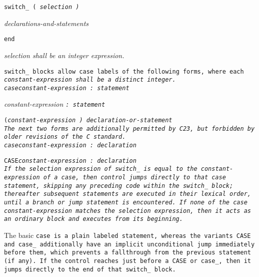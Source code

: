 \def\Subsubsection#1{\subsubsection{#1}}


\tt{switch_ (} \it{selection} \tt{)}

\s\s\s\s\it{declarations-and-statements}\opt

\tt{end}


\it{selection} shall be an integer expression.


\tt{switch_} blocks allow case labels of the following forms,
where each \it{constant-expression} shall be a distinct integer.\\

 \tt{case}\s\s\s\s\it{constant-expression} \tt{:} \it{statement}

\s\s\s\s\it{constant-expression} \tt{:} \it{statement}

\s\tt{(}\s\it{constant-expression} \tt{)}
\it{declaration-or-statement}\opt\\

The next two forms are additionally permitted by C23,
but forbidden by older revisions of the C standard.\\

\tt{case}\s\s\s\s\it{constant-expression} \tt{:} \it{declaration}

\tt{CASE}\s\s\s\s\it{constant-expression} \tt{:} \it{declaration}\\

If the \it{selection} expression of \tt{switch_}
is equal to the \it{constant-expression} of a case,
then control jumps directly to that case statement,
skipping any preceding code within the \tt{switch_} block;
thereafter subsequent statements are executed in their lexical order,
until a branch or jump statement is encountered.
If none of the case \it{constant-expression} matches the \it{selection}
expression, then it acts as an ordinary block and executes from its beginning.

The basic \tt{case} is a plain labeled statement,
whereas the variants \tt{CASE} and \tt{case_} additionally
have an implicit unconditional jump immediately before them,
which prevents a fallthrough from the previous statement (if any).
If the control reaches just before a \tt{CASE} or \tt{case_},
then it jumps directly to the end of that \tt{switch_} block.

